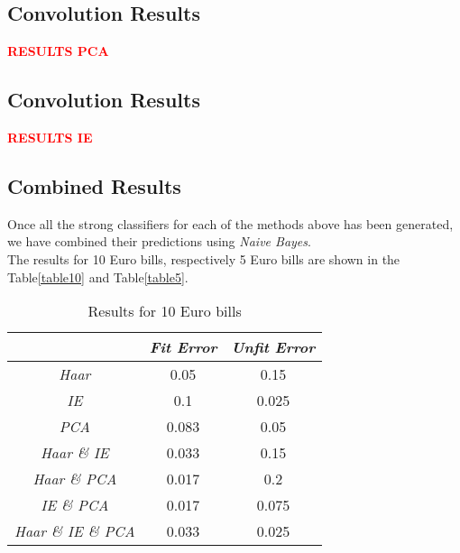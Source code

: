 \documentclass[11pt,twocolumn]{article}
\newcommand{\todo}[1]{\textcolor{red}{\textbf{#1}}}
\begin{document}
	\subsection{Convolution Results}\label{sec:pca_results}
	\todo{RESULTS PCA}

	\subsection{Convolution Results}\label{sec:ie_results}
	\todo{RESULTS IE}

	\subsection{Combined Results}\label{sec:comb_results}
	\hspace*{10px}Once all the strong classifiers for each of the methods above has been generated, we have combined their predictions using \emph{Naive Bayes}.\\
	\hspace*{10px}The results for 10 Euro bills, respectively 5 Euro bills are shown in the Table\ref{table10} and Table\ref{table5}.
		\begin{table}[!htbp]
			\caption{Results for 10 Euro bills}
			\selectfont\small
			\label{table10}
			\centering 
			\begin{tabular}{ | c | c | c|}
				\hline\hline & \emph{Fit Error} & \emph{Unfit Error} \\ [0.5ex]\hline 
				\emph{Haar} & 0.05 & 0.15 \\ [0.5ex]\hline
				\emph{IE} & 0.1 & 0.025 \\ [0.5ex]\hline
				\emph{PCA} & 0.083 & 0.05 \\ [0.5ex]\hline
				\emph{Haar \& IE} & 0.033 & 0.15 \\ [0.5ex]\hline
				\emph{Haar \& PCA} & 0.017 & 0.2 \\ [0.5ex]\hline
				\emph{IE \& PCA} & 0.017 & 0.075 \\ [0.5ex]\hline
				\emph{Haar \& IE \& PCA} & 0.033 & 0.025 \\ [0.5ex]\hline
			\end{tabular}
			\label{table:nonlin} 
		\end{table}		
\end{document}
